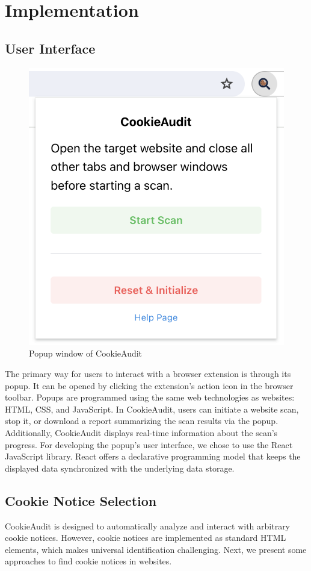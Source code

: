 \chapter{Implementation} \label{ch:implementation}

\section{User Interface}
\begin{figure}
	\centering
	\includegraphics[width=0.5\linewidth]{screenshot_popup.png}
	\caption{Popup window of CookieAudit}
	\label{fig:screenshot-popup}
\end{figure}
The primary way for users to interact with a browser extension is through its popup.
It can be opened by clicking the extension's action icon in the browser toolbar.
Popups are programmed using the same web technologies as websites: HTML, CSS, and JavaScript.
In CookieAudit, users can initiate a website scan, stop it, or download a report summarizing the scan results via the popup.
Additionally, CookieAudit displays real-time information about the scan's progress.
For developing the popup's user interface, we chose to use the React JavaScript library.
React offers a declarative programming model that keeps the displayed data synchronized with the underlying data storage.

\section{Cookie Notice Selection}
CookieAudit is designed to automatically analyze and interact with arbitrary cookie notices. 
However, cookie notices are implemented as standard HTML elements, which makes universal identification challenging.
Next, we present some approaches to find cookie notices in websites.

